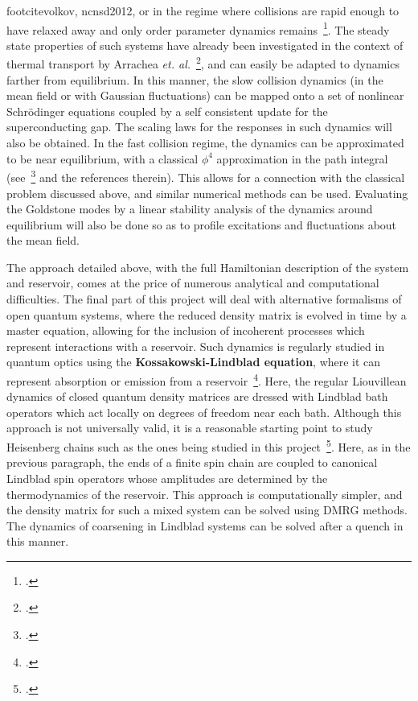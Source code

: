 \documentclass[a4paper,11pt]{article}
\begin{document}
footcite{volkov,
ncnsd2012}, or in the regime where collisions are rapid enough to have relaxed away and only order parameter dynamics remains~\footcite{ncnsd2012}. The steady state properties of such systems have already been investigated in the context of thermal transport by Arrachea \textit{et. al.}~\footcite{arrachea}, and can easily be adapted to dynamics farther from equilibrium. In this manner, the slow collision dynamics (in the mean field or with Gaussian fluctuations) can be mapped onto a set of nonlinear Schr\"odinger equations coupled by a self consistent update for the superconducting gap. The scaling laws for the responses in such dynamics will also be obtained.  In the fast collision regime, the dynamics can be approximated to be near equilibrium, with a classical $\phi^4$ approximation in the path integral (see~\footcite{colrev} and the references therein). This allows for a connection with the classical problem discussed above, and similar numerical methods can be used. Evaluating the Goldstone modes by a 
linear 
stability analysis of the dynamics around equilibrium will also be done so as to profile excitations and fluctuations about the mean field.

The approach detailed above, with the full Hamiltonian description of the system and reservoir, comes at the price of numerous analytical and computational difficulties. The final part of this project will deal with alternative formalisms of open quantum systems, where the reduced density matrix is evolved in time by a master equation, allowing for the inclusion of incoherent processes which represent interactions with a reservoir. Such dynamics is regularly studied in quantum optics using the \textbf{Kossakowski-Lindblad equation}, where it can represent absorption or emission from a reservoir~\footcite{lindblad1,lindblad2}. Here, the regular Liouvillean dynamics of closed quantum density matrices are dressed with Lindblad bath operators which act locally on degrees of freedom near each bath. Although this approach is not universally valid, it is a reasonable starting point to study Heisenberg chains such as the ones being studied in this project~\footcite{spinchains:lindblad}. Here, as in the previous 
paragraph, the 
ends of 
a finite spin chain are coupled to canonical Lindblad spin operators whose amplitudes are determined by the thermodynamics of the reservoir.  This approach is computationally simpler, and the density matrix for such a mixed system can be solved using DMRG methods. The dynamics of coarsening in Lindblad systems can be solved after a quench in this manner.
\end{document}
